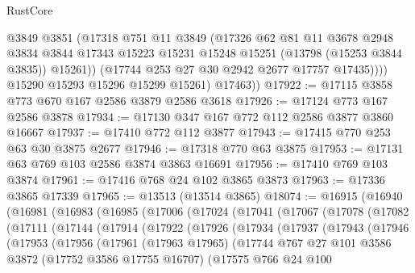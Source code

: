 \begin{lexlean}{RustCore}
\begin{coremodule}
                @3849
                @3851
                (@17318
                  @751
                  @11
                  @3849
                  (@17326
                    @62
                    @81
                    @11
                    @3678
                    @2948
                    @3834
                    @3844
                    @17343
                    @15223
                    @15231
                    @15248
                    @15251
                    (@13798 (@15253 @3844 @3835))
                    @15261))
                (@17744 @253 @27 @30 @2942 @2677 @17757 @17435))))
          @15290
          @15293
          @15296
          @15299
          @15261)
        @17463))
@17922 := @17115 @3858 @773 @670 @167 @2586 @3879 @2586 @3618
@17926 := @17124 @773 @167 @2586 @3878
@17934 := @17130 @347 @167 @772 @112 @2586 @3877 @3860 @16667
@17937 := @17410 @772 @112 @3877
@17943 := @17415 @770 @253 @63 @30 @3875 @2677
@17946 := @17318 @770 @63 @3875
@17953 := @17131 @63 @769 @103 @2586 @3874 @3863 @16691
@17956 := @17410 @769 @103 @3874
@17961 := @17416 @768 @24 @102 @3865 @3873
@17963 := @17336 @3865 @17339
@17965 := @13513 (@13514 @3865)
@18074 := @16915
    (@16940
      (@16981
        (@16983
          (@16985
            (@17006
              (@17024
                (@17041
                  (@17067
                    (@17078
                      (@17082
                        (@17111
                          (@17144
                            (@17914
                              (@17922
                                (@17926
                                  (@17934
                                    (@17937
                                      (@17943
                                        (@17946
                                          (@17953
                                            (@17956
                                              (@17961
                                                (@17963 @17965)
                                                (@17744
                                                  @767
                                                  @27
                                                  @101
                                                  @3586
                                                  @3872
                                                  (@17752 @3586 @17755 @16707)
                                                  (@17575
                                                    @766
                                                    @24
                                                    @100

\end{coremodule}
\end{lexlean}
